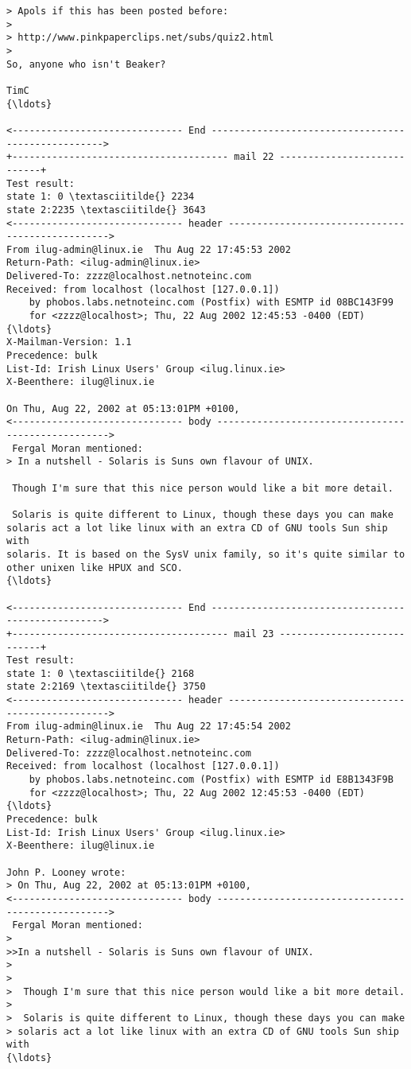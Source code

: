 \documentclass[11pt]{article}
\begin{document}
\begin{Verbatim}[commandchars=\\\{\}]
> Apols if this has been posted before:
> 
> http://www.pinkpaperclips.net/subs/quiz2.html
>
So, anyone who isn't Beaker?

TimC
{\ldots}

<------------------------------ End --------------------------------------------------->
+-------------------------------------- mail 22 ----------------------------+
Test result:
state 1: 0 \textasciitilde{} 2234
state 2:2235 \textasciitilde{} 3643
<------------------------------ header ------------------------------------------------->
From ilug-admin@linux.ie  Thu Aug 22 17:45:53 2002
Return-Path: <ilug-admin@linux.ie>
Delivered-To: zzzz@localhost.netnoteinc.com
Received: from localhost (localhost [127.0.0.1])
	by phobos.labs.netnoteinc.com (Postfix) with ESMTP id 08BC143F99
	for <zzzz@localhost>; Thu, 22 Aug 2002 12:45:53 -0400 (EDT)
{\ldots}
X-Mailman-Version: 1.1
Precedence: bulk
List-Id: Irish Linux Users' Group <ilug.linux.ie>
X-Beenthere: ilug@linux.ie

On Thu, Aug 22, 2002 at 05:13:01PM +0100,
<------------------------------ body --------------------------------------------------->
 Fergal Moran mentioned:
> In a nutshell - Solaris is Suns own flavour of UNIX.

 Though I'm sure that this nice person would like a bit more detail.

 Solaris is quite different to Linux, though these days you can make
solaris act a lot like linux with an extra CD of GNU tools Sun ship with
solaris. It is based on the SysV unix family, so it's quite similar to
other unixen like HPUX and SCO.
{\ldots}

<------------------------------ End --------------------------------------------------->
+-------------------------------------- mail 23 ----------------------------+
Test result:
state 1: 0 \textasciitilde{} 2168
state 2:2169 \textasciitilde{} 3750
<------------------------------ header ------------------------------------------------->
From ilug-admin@linux.ie  Thu Aug 22 17:45:54 2002
Return-Path: <ilug-admin@linux.ie>
Delivered-To: zzzz@localhost.netnoteinc.com
Received: from localhost (localhost [127.0.0.1])
	by phobos.labs.netnoteinc.com (Postfix) with ESMTP id E8B1343F9B
	for <zzzz@localhost>; Thu, 22 Aug 2002 12:45:53 -0400 (EDT)
{\ldots}
Precedence: bulk
List-Id: Irish Linux Users' Group <ilug.linux.ie>
X-Beenthere: ilug@linux.ie

John P. Looney wrote:
> On Thu, Aug 22, 2002 at 05:13:01PM +0100,
<------------------------------ body --------------------------------------------------->
 Fergal Moran mentioned:
> 
>>In a nutshell - Solaris is Suns own flavour of UNIX.
> 
> 
>  Though I'm sure that this nice person would like a bit more detail.
> 
>  Solaris is quite different to Linux, though these days you can make
> solaris act a lot like linux with an extra CD of GNU tools Sun ship with
{\ldots}


\end{Verbatim}
\end{document}
